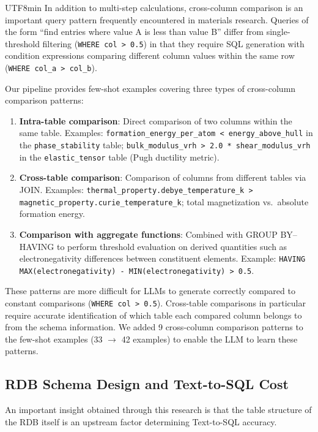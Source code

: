 \documentclass[sn-mathphys,Numbered]{sn-jnl}
\begin{document}
\begin{CJK}{UTF8}{min}
In addition to multi-step calculations, cross-column comparison is
an important query pattern frequently encountered in materials
research.
Queries of the form ``find entries where value A is less than
value B'' differ from single-threshold filtering
(\texttt{WHERE col > 0.5}) in that they require SQL generation
with condition expressions comparing different column values
within the same row (\texttt{WHERE col\_a > col\_b}).

Our pipeline provides few-shot examples covering three types of
cross-column comparison patterns:
\begin{enumerate}
  \item \textbf{Intra-table comparison}:
    Direct comparison of two columns within the same table.
    Examples: \texttt{formation\_energy\_per\_atom < energy\_above\_hull}
    in the \texttt{phase\_stability} table;
    \texttt{bulk\_modulus\_vrh > 2.0 * shear\_modulus\_vrh}
    in the \texttt{elastic\_tensor} table (Pugh ductility metric).
  \item \textbf{Cross-table comparison}:
    Comparison of columns from different tables via JOIN.
    Examples: \texttt{thermal\_property.debye\_temperature\_k >
    magnetic\_property.curie\_temperature\_k};
    total magnetization vs.\ absolute formation energy.
  \item \textbf{Comparison with aggregate functions}:
    Combined with GROUP BY--HAVING to perform threshold evaluation
    on derived quantities such as electronegativity differences
    between constituent elements.
    Example:
    \texttt{HAVING MAX(electronegativity) - MIN(electronegativity) > 0.5}.
\end{enumerate}

These patterns are more difficult for LLMs to generate correctly
compared to constant comparisons (\texttt{WHERE col > 0.5}).
Cross-table comparisons in particular require accurate
identification of which table each compared column belongs to
from the schema information.
We added 9 cross-column comparison patterns to the few-shot
examples (33 $\to$ 42 examples) to enable the LLM to learn these
patterns.

\subsection{RDB Schema Design and Text-to-SQL Cost}
\label{sec:schema_design_cost}

An important insight obtained through this research is that the
table structure of the RDB itself is an upstream factor determining
Text-to-SQL accuracy.


\end{CJK}
\end{document}
